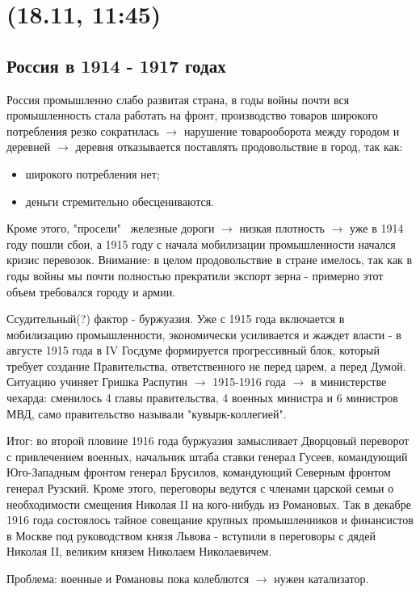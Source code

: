 \section{(18.11, 11:45)}

\subsection{Россия в 1914 - 1917 годах}
Россия промышленно слабо развитая страна, в годы войны почти вся промышленность стала работать на фронт, производство товаров широкого потребления резко сократилась $\rightarrow$ нарушение товарооборота между городом и деревней $\rightarrow$ деревня отказывается поставлять продовольствие в город, так как:
\begin{itemize}
	\item широкого потребления нет;
	\item деньги стремительно обесцениваются.
\end{itemize}

Кроме этого, "просели" \ железные дороги $\rightarrow$ низкая плотность $\rightarrow$ уже в 1914 году пошли сбои, а 1915 году с начала мобилизации промышленности начался кризис перевозок. Внимание: в целом продовольствие в стране имелось, так как в годы войны мы почти полностью прекратили экспорт зерна - примерно этот объем требовался городу и армии.

Ссудительный(?) фактор - буржуазия. Уже с 1915 года включается в мобилизацию промышленности, экономически усиливается и жаждет власти - в августе 1915 года в IV Госдуме формируется прогрессивный блок, который требует создание Правительства, ответственного не перед царем, а перед Думой. Ситуацию учиняет Гришка Распутин $\rightarrow$ 1915-1916 года $\rightarrow$ в министерстве чехарда: сменилось 4 главы правительства, 4 военных министра и 6 министров МВД, само правительство называли "кувырк-коллегией".

Итог: во второй пловине 1916 года буржуазия замысливает Дворцовый переворот с привлечением военных, начальник штаба ставки генерал Гусеев, командующий Юго-Западным фронтом генерал Брусилов, командующий Северным фронтом генерал Рузский. Кроме этого, переговоры ведутся с членами царской семьи о необходимости смещения Николая II на кого-нибудь из Романовых. Так в декабре 1916 года состоялось тайное совещание крупных промышленников и финансистов в Москве под руководством князя Львова - вступили в переговоры с дядей Николая II, великим князем Николаем Николаевичем.

Проблема: военные и Романовы пока колеблются $\rightarrow$ нужен катализатор.

